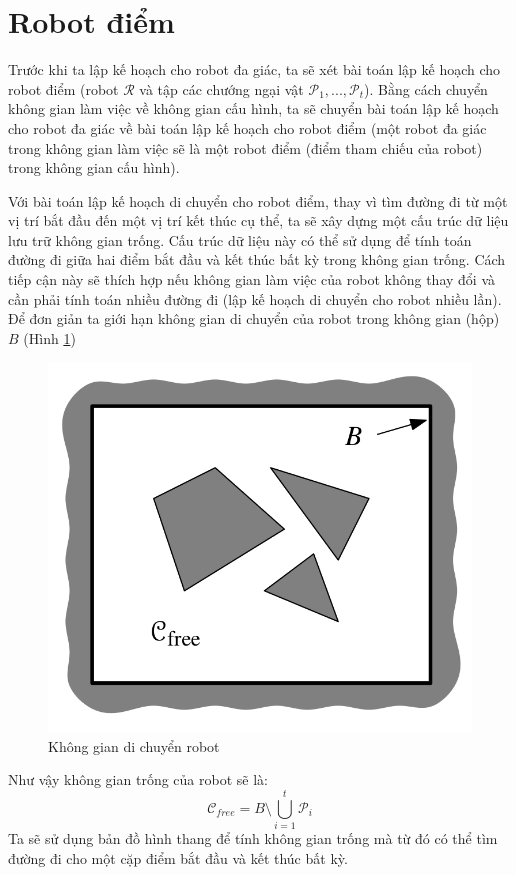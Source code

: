 \documentclass[a4paper,12pt]{report}
\begin{document}
\section{Robot điểm}
Trước khi ta lập kế hoạch cho robot đa giác, ta sẽ xét bài toán lập kế hoạch cho robot điểm (robot $\mathcal{R}$ và tập các chướng ngại vật $\mathcal{P}_1,...,\mathcal{P}_t$). Bằng cách chuyển không gian làm việc về không gian cấu hình, ta sẽ chuyển bài toán lập kế hoạch cho robot đa giác về bài toán lập kế hoạch cho robot điểm (một robot đa giác trong không gian làm việc sẽ là một robot điểm (điểm tham chiếu của robot) trong không gian cấu hình).
\par Với bài toán lập kế hoạch di chuyển cho robot điểm, thay vì tìm đường đi từ một vị trí bắt đầu đến một vị trí kết thúc cụ thể, ta sẽ xây dựng một cấu trúc dữ liệu lưu trữ không gian trống. Cấu trúc dữ liệu này có thể sử dụng để tính toán đường đi giữa hai điểm bắt đầu và kết thúc bất kỳ trong không gian trống. Cách tiếp cận này sẽ thích hợp nếu không gian làm việc của robot không thay đổi và cần phải tính toán nhiều đường đi (lập kế hoạch di chuyển cho robot nhiều lần).\\[0.6em]
Để đơn giản ta giới hạn không gian di chuyển của robot trong không gian (hộp) $B$ (Hình \ref{fig_moving_space})
\begin{figure}[H]
\centering
\includegraphics[scale=0.25]{moving_space.png}
\caption{Không gian di chuyển robot}
\label{fig_moving_space}
\end{figure}
Như vậy không gian trống của robot sẽ là:
$$\mathcal{C}_{free} = B \setminus \bigcup_{i=1}^t \mathcal{P}_i$$
Ta sẽ sử dụng bản đồ hình thang để tính không gian trống mà từ đó có thể tìm đường đi cho một cặp điểm bắt đầu và kết thúc bất kỳ.
\end{document}
